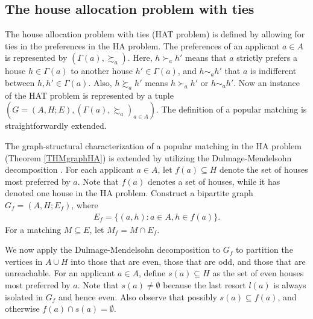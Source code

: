 \documentclass[11pt,a4paper,showkeys]{article}
\theoremstyle{plain}
\theoremstyle{definition}
\begin{document}
\subsection{The house allocation problem with ties}
    
The house allocation problem with ties (HAT problem) is defined by 
allowing for ties in the preferences in the HA problem. 
The preferences of an applicant $a\in A$ is represented by $(\Gamma(a), \succsim_a)$. 
Here, $h \succ_a h'$ means that $a$ strictly prefers a house $h\in \Gamma(a)$ to another house $h' \in\Gamma(a)$, 
and 
$h \sim_a h'$ that $a$ is indifferent between $h,h'\in \Gamma(a)$. 
Also, 
$h \succsim_a h'$ means $h \succ_a h'$ or $h \sim_a h'$. 
Now an instance of the HAT problem is represented by a tuple
$(G=(A,H;E),(\Gamma(a),\succsim_a)_{a\in A})$. 
The definition of a popular matching is straightforwardly extended. 


The graph-structural characterization of a popular matching in the HA problem (Theorem \ref{THMgraphHA}) is extended by utilizing the Dulmage-Mendelsohn decomposition \cite{DM58,DM59}. 
For each applicant $a\in A$, 
let $f(a)\subseteq H$ denote the set of houses most preferred by $a$. 
Note that $f(a)$ denotes a set of houses, 
while it has denoted one house in the HA problem. 
Construct a bipartite graph $G_f = (A, H; E_f)$, 
where 
\begin{align*}
    E_f= \{ (a,h) \colon a\in A, h\in f(a) \}. 
\end{align*}
For a matching $M\subseteq E$, 
let $M_f = M \cap E_f$. 

We now apply the Dulmage-Mendelsohn decomposition to $G_f$ to partition the vertices in $A\cup H$ 
into those that are even, those that are odd, and those that are unreachable. 
For an applicant $a\in A$, 
define $s(a)\subseteq H$ as 
the set of even houses most preferred by $a$. 
Note that 
$s(a) \neq \emptyset$ because the last resort $l(a)$ is always isolated in $G_f$ and hence even. 
Also observe that possibly $s(a)\subseteq f(a)$, 
and otherwise $f(a) \cap s(a) = \emptyset$. 
\end{document}
